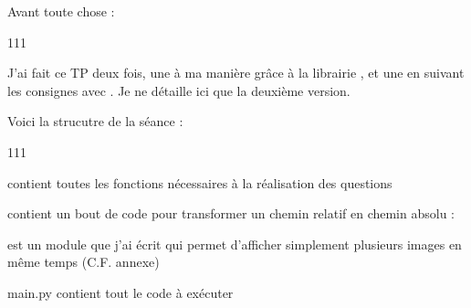Avant toute chose :
\begin{dinglist}{111}
      \item J'ai fait ce TP deux fois, une à ma manière grâce à la
      librairie , et une en suivant les consignes avec
      . Je ne détaille ici que la deuxième version.
      \item Voici la strucutre de la séance :
      \begin{dinglist}{111}
            \item
             contient toutes les fonctions
            nécessaires à la réalisation des questions

            \item
             contient un bout de code pour transformer un
            chemin relatif en chemin absolu :

            \item
             est un module que j'ai écrit qui
            permet d'afficher simplement plusieurs images en même temps
            (C.F. annexe)

            \item
             main.py contient tout le code à
            exécuter
      \end{dinglist}
\end{dinglist}
